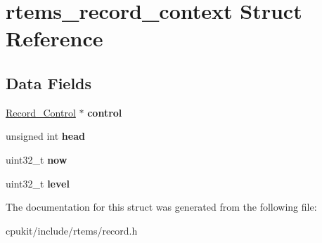 \hypertarget{structrtems__record__context}{}\section{rtems\+\_\+record\+\_\+context Struct Reference}
\label{structrtems__record__context}
\subsection*{Data Fields}
\begin{DoxyCompactItemize}
\item 
\mbox{\label{structrtems__record__context_a778bbf0f497f4362f4a2fd4fd7e7e56c}} 
\mbox{\hyperlink{structRecord__Control}{Record\+\_\+\+Control}} $\ast$ {\bfseries control}
\item 
\mbox{\label{structrtems__record__context_ae0d75cb4d3eeeb66a415e6fb3740999d}} 
unsigned int {\bfseries head}
\item 
\mbox{\label{structrtems__record__context_a9104781b21f779ad1e12bbd43d25b539}} 
uint32\+\_\+t {\bfseries now}
\item 
\mbox{\label{structrtems__record__context_aa3c38ff47d346540d60605e9b168a5fb}} 
uint32\+\_\+t {\bfseries level}
\end{DoxyCompactItemize}


The documentation for this struct was generated from the following file\+:\begin{DoxyCompactItemize}
\item 
cpukit/include/rtems/record.\+h\end{DoxyCompactItemize}
